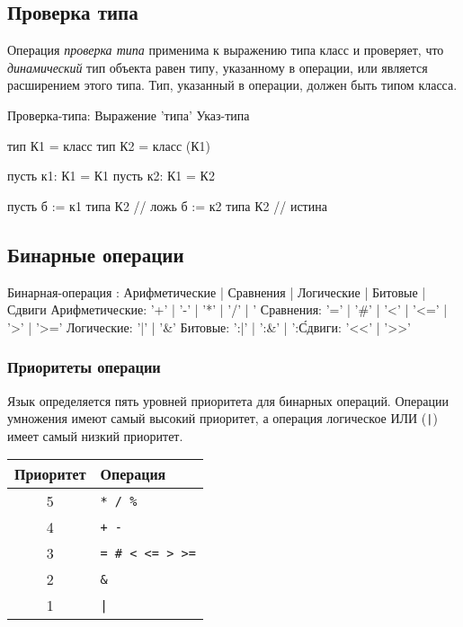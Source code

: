 \hypertarget{of-type}{%
\subsection{Проверка типа}\label{expr:of-type}}

Операция \emph{проверка типа} применима к выражению типа класс и проверяет, что \emph{динамический} тип объекта равен типу, указанному в операции, 
или является расширением этого типа. Тип, указанный в операции, должен быть типом класса.

\begin{Grammar}
Проверка-типа: Выражение 'типа' Указ-типа 
\end{Grammar}    

\begin{Trivil}
тип К1 = класс {}
тип К2 = класс (К1) {}

пусть к1: К1 = К1{}
пусть к2: К1 = К2{}

пусть б :=  к1 типа К2 // ложь
б := к2 типа К2 // истина
\end{Trivil}


\hypertarget{binary-ops}{%
\subsection{Бинарные операции}\label{expr:binary-ops}}

\begin{Grammar}
Бинарная-операция
    : Арифметические
    | Сравнения
    | Логические
    | Битовые
    | Сдвиги
Арифметические: '+' | '-' | '*' | '/' | '%
Сравнения: '=' | '#' | '<' | '<=' | '>' | '>='
Логические: '|' | '&' 
Битовые: ':|' | ':&' | ':\'
Сдвиги:   '<<' | '>>'
\end{Grammar} 


\hypertarget{ops-precedence}{%
\subsubsection{Приоритеты операции}\label{expr:ops-precedence}}

Язык определяется пять уровней приоритета для бинарных операций. Операции умножения имеют самый высокий приоритет, а операция логическое ИЛИ (\verb+|+) имеет самый низкий приоритет.

\begin{tabular}[c]{c|l}
\textbf{Приоритет} & \textbf{Операция} \\ 
\hline
5 &   \verb#* / %# \\
4 &   \verb#+ -# \\
3 &   \verb|= # < <= > >=| \\
2 &   \verb#&# \\
1 &  \verb#|# \\
\hline
\end{tabular}

